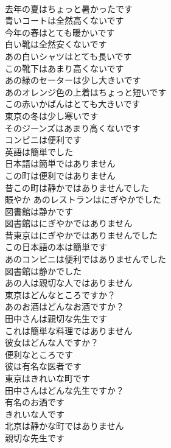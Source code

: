 \documentclass[8pt]{extreport}
\begin{document}
\begin{CJK}{UTF8}{min}
\\	去年の夏はちょっと暑かったです	
\\	青いコートは全然高くないです	
\\	今年の春はとても暖かいです	
\\	白い靴は全然安くないです	
\\	あの白いシャツはとても長いです	
\\	この靴下はあまり高くないです	
\\	あの緑のセーターは少し大きいです	
\\	あのオレンジ色の上着はちょっと短いです	
\\	この赤いかばんはとても大きいです	
\\	東京の冬は少し寒いです	
\\	そのジーンズはあまり高くないです	
\\	コンビニは便利です	
\\	英語は簡単でした	
\\	日本語は簡単ではありません	
\\	この町は便利ではありません	
\\	昔この町は静かではありませんでした	
\\	賑やか	あのレストランはにぎやかでした	
\\	図書館は静かです	
\\	図書館はにぎやかではありません	
\\	昔東京はにぎやかではありませんでした	
\\	この日本語の本は簡単です	
\\	あのコンビニは便利ではありませんでした	
\\	図書館は静かでした	
\\	あの人は親切な人ではありません	
\\	東京はどんなところですか？	
\\	あのお酒はどんなお酒ですか？	
\\	田中さんは親切な先生です	
\\	これは簡単な料理ではありません	
\\	彼女はどんな人ですか？	
\\	便利なところです	
\\	彼は有名な医者です	
\\	東京はきれいな町です	
\\	田中さんはどんな先生ですか？	
\\	有名のお酒です	
\\	きれいな人です	
\\	北京は静かな町ではありません	
\\	親切な先生です	

\end{CJK}
\end{document}
